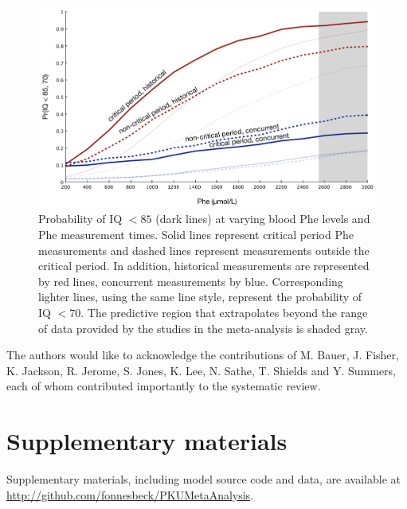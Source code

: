 \documentclass{svjour3}                     %
\begin{document}
\begin{figure}[p]
    \includegraphics[width=\textwidth]{figure.pdf}

    \caption{Probability of IQ $<85$ (dark lines) at varying blood Phe levels and Phe measurement times. Solid lines represent critical period Phe measurements and dashed lines represent measurements outside the critical period. In addition, historical measurements are represented by red lines, concurrent measurements by blue. Corresponding lighter lines, using the same line style, represent the probability of IQ $<70$. The predictive region that extrapolates beyond the range of data provided by the studies in the meta-analysis is shaded gray.} \label{fig:probs}
\end{figure}


\begin{acknowledgements}
The authors would like to acknowledge the contributions of M. Bauer, J. Fisher, K. Jackson, R. Jerome, S. Jones, K. Lee, N. Sathe, T. Shields and Y. Summers, each of whom contributed importantly to the systematic review.
\end{acknowledgements}

\appendix
\section{Supplementary materials} %
\label{sec:Supplementary materials}

Supplementary materials, including model source code and data, are available at \url{http://github.com/fonnesbeck/PKUMetaAnalysis}.
\end{document}
